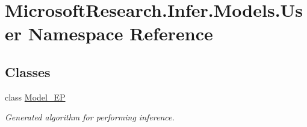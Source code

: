 \hypertarget{namespace_microsoft_research_1_1_infer_1_1_models_1_1_user}{}\section{Microsoft\+Research.\+Infer.\+Models.\+User Namespace Reference}
\label{namespace_microsoft_research_1_1_infer_1_1_models_1_1_user}
\subsection*{Classes}
\begin{DoxyCompactItemize}
\item 
class \hyperlink{class_microsoft_research_1_1_infer_1_1_models_1_1_user_1_1_model___e_p}{Model\+\_\+\+E\+P}
\begin{DoxyCompactList}\small\item\em Generated algorithm for performing inference. \end{DoxyCompactList}\end{DoxyCompactItemize}
